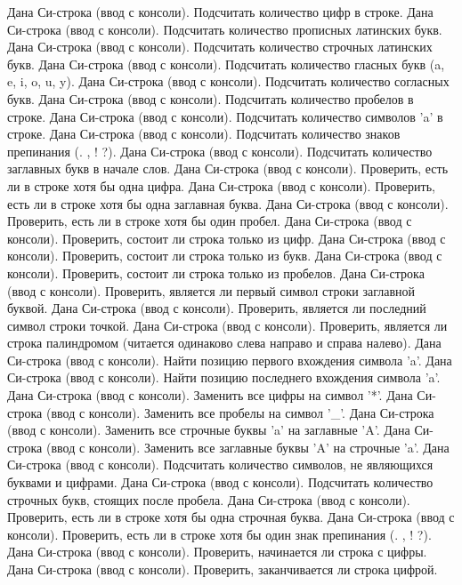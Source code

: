 Дана Си-строка (ввод с консоли). Подсчитать количество цифр в строке.
Дана Си-строка (ввод с консоли). Подсчитать количество прописных латинских букв.
Дана Си-строка (ввод с консоли). Подсчитать количество строчных латинских букв.
Дана Си-строка (ввод с консоли). Подсчитать количество гласных букв (a, e, i, o, u, y).
Дана Си-строка (ввод с консоли). Подсчитать количество согласных букв.
Дана Си-строка (ввод с консоли). Подсчитать количество пробелов в строке.
Дана Си-строка (ввод с консоли). Подсчитать количество символов 'a' в строке.
Дана Си-строка (ввод с консоли). Подсчитать количество знаков препинания (. , ! ?).
Дана Си-строка (ввод с консоли). Подсчитать количество заглавных букв в начале слов.
Дана Си-строка (ввод с консоли). Проверить, есть ли в строке хотя бы одна цифра.
Дана Си-строка (ввод с консоли). Проверить, есть ли в строке хотя бы одна заглавная буква.
Дана Си-строка (ввод с консоли). Проверить, есть ли в строке хотя бы один пробел.
Дана Си-строка (ввод с консоли). Проверить, состоит ли строка только из цифр.
Дана Си-строка (ввод с консоли). Проверить, состоит ли строка только из букв.
Дана Си-строка (ввод с консоли). Проверить, состоит ли строка только из пробелов.
Дана Си-строка (ввод с консоли). Проверить, является ли первый символ строки заглавной буквой.
Дана Си-строка (ввод с консоли). Проверить, является ли последний символ строки точкой.
Дана Си-строка (ввод с консоли). Проверить, является ли строка палиндромом (читается одинаково слева направо и справа налево).
Дана Си-строка (ввод с консоли). Найти позицию первого вхождения символа 'a'.
Дана Си-строка (ввод с консоли). Найти позицию последнего вхождения символа 'a'.
Дана Си-строка (ввод с консоли). Заменить все цифры на символ '*'.
Дана Си-строка (ввод с консоли). Заменить все пробелы на символ '_'.
Дана Си-строка (ввод с консоли). Заменить все строчные буквы 'a' на заглавные 'A'.
Дана Си-строка (ввод с консоли). Заменить все заглавные буквы 'A' на строчные 'a'.
Дана Си-строка (ввод с консоли). Подсчитать количество символов, не являющихся буквами и цифрами.
Дана Си-строка (ввод с консоли). Подсчитать количество строчных букв, стоящих после пробела.
Дана Си-строка (ввод с консоли). Проверить, есть ли в строке хотя бы одна строчная буква.
Дана Си-строка (ввод с консоли). Проверить, есть ли в строке хотя бы один знак препинания (. , ! ?).
Дана Си-строка (ввод с консоли). Проверить, начинается ли строка с цифры.
Дана Си-строка (ввод с консоли). Проверить, заканчивается ли строка цифрой.
